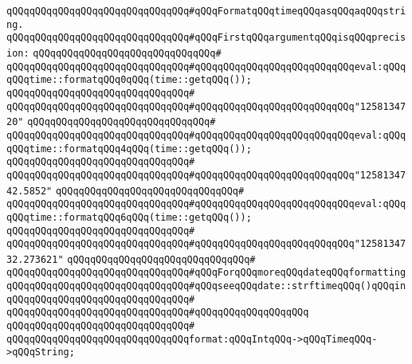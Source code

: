 \newline
\verb|qQQqqQQqqQQqqQQqqQQqqQQqqQQqqQQq#qQQqFormatqQQqtimeqQQqasqQQqaqQQqstring.|\newline
\verb|qQQqqQQqqQQqqQQqqQQqqQQqqQQqqQQq#qQQqFirstqQQqargumentqQQqisqQQqprecision:|\newline
\verb|qQQqqQQqqQQqqQQqqQQqqQQqqQQqqQQq#|\newline
\verb|qQQqqQQqqQQqqQQqqQQqqQQqqQQqqQQq#qQQqqQQqqQQqqQQqqQQqqQQqqQQqeval:qQQqqQQqtime::formatqQQq0qQQq(time::getqQQq());|\newline
\verb|qQQqqQQqqQQqqQQqqQQqqQQqqQQqqQQq#|\newline
\verb|qQQqqQQqqQQqqQQqqQQqqQQqqQQqqQQq#qQQqqQQqqQQqqQQqqQQqqQQqqQQq"1258134720"|\newline
\verb|qQQqqQQqqQQqqQQqqQQqqQQqqQQqqQQq#|\newline
\verb|qQQqqQQqqQQqqQQqqQQqqQQqqQQqqQQq#qQQqqQQqqQQqqQQqqQQqqQQqqQQqeval:qQQqqQQqtime::formatqQQq4qQQq(time::getqQQq());|\newline
\verb|qQQqqQQqqQQqqQQqqQQqqQQqqQQqqQQq#|\newline
\verb|qQQqqQQqqQQqqQQqqQQqqQQqqQQqqQQq#qQQqqQQqqQQqqQQqqQQqqQQqqQQq"1258134742.5852"|\newline
\verb|qQQqqQQqqQQqqQQqqQQqqQQqqQQqqQQq#|\newline
\verb|qQQqqQQqqQQqqQQqqQQqqQQqqQQqqQQq#qQQqqQQqqQQqqQQqqQQqqQQqqQQqeval:qQQqqQQqtime::formatqQQq6qQQq(time::getqQQq());|\newline
\verb|qQQqqQQqqQQqqQQqqQQqqQQqqQQqqQQq#|\newline
\verb|qQQqqQQqqQQqqQQqqQQqqQQqqQQqqQQq#qQQqqQQqqQQqqQQqqQQqqQQqqQQq"1258134732.273621"|\newline
\verb|qQQqqQQqqQQqqQQqqQQqqQQqqQQqqQQq#|\newline
\verb|qQQqqQQqqQQqqQQqqQQqqQQqqQQqqQQq#qQQqForqQQqmoreqQQqdateqQQqformatting|\newline
\verb|qQQqqQQqqQQqqQQqqQQqqQQqqQQqqQQq#qQQqseeqQQqdate::strftimeqQQq()qQQqin|\newline
\verb|qQQqqQQqqQQqqQQqqQQqqQQqqQQqqQQq#|\newline
\verb|qQQqqQQqqQQqqQQqqQQqqQQqqQQqqQQq#qQQqqQQqqQQqqQQqqQQq|\newline
\verb|qQQqqQQqqQQqqQQqqQQqqQQqqQQqqQQq#|\newline
\verb|qQQqqQQqqQQqqQQqqQQqqQQqqQQqqQQqformat:qQQqIntqQQq->qQQqTimeqQQq->qQQqString;|\newline
\newline
